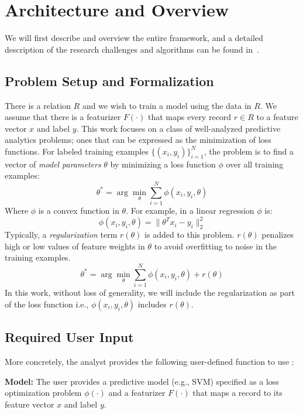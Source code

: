 \section{Architecture and Overview}\label{arch}
We will first describe \sys and overview the entire framework, and a detailed description of the research challenges and algorithms can be found in~\cite{activecleanarxiv}.

\subsection{Problem Setup and Formalization}
There is a relation $R$ and we wish to train a model using the data in $R$.
We assume that there is a featurizer $F(\cdot)$ that maps every record $r \in R$ to a feature vector $x$ and label $y$.
This work focuses on a class of well-analyzed predictive analytics problems; ones that can be expressed as the minimization of loss functions.
For labeled training examples $\{(x_{i},y_{i})\}_{i=1}^{N}$, the problem is to find a vector of \emph{model parameters} $\theta$ by minimizing a loss function $\phi$ over all training examples:
\[
 \theta^{*}=\arg\min_{\theta}\sum_{i=1}^{N}\phi(x_{i},y_{i},\theta)
\]
Where $\phi$ is a convex function in $\theta$.
For example, in a linear regression $\phi$ is:
\[
\phi(x_{i},y_{i},\theta) = \|\theta^Tx_{i} - y_i \|_2^2
\]
Typically, a \emph{regularization} term $r(\theta)$ is added to this problem.
$r(\theta)$ penalizes high or low values of feature weights in $\theta$ to avoid overfitting to noise in the training examples.
\begin{equation}
 \theta^{*}=\arg\min_{\theta}\sum_{i=1}^{N}\phi(x_{i},y_{i},\theta) + r(\theta)
 \label{ideal}
\end{equation}
In this work, without loss of generality, we will include the regularization as part of the loss function i.e., $\phi(x_{i},y_{i},\theta)$ includes $r(\theta)$.

\subsection{Required User Input}\label{uinp}
More concretely, the analyst provides the following user-defined function to use \sys:

\noindent\textbf{Model:} The user provides a predictive model (e.g., SVM) specified as a loss optimization problem $\phi(\cdot)$ and a featurizer $F(\cdot)$ that maps a record to its feature vector $x$ and label $y$.

\vspace{0.25em}

